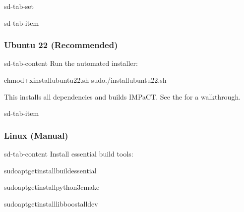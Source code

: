 \documentclass[a4paper,10pt,english]{sphinxmanual}
\begin{document}
\begin{sphinxuseclass}{sd-tab-set}
\begin{sphinxuseclass}{sd-tab-item}\subsubsection*{Ubuntu 22 (Recommended)}

\begin{sphinxuseclass}{sd-tab-content}
\sphinxAtStartPar
Run the automated installer:

\begin{sphinxVerbatim}[commandchars=\\\{\}]
chmod+xinstall\PYGZus{}ubuntu22.sh
sudo./install\PYGZus{}ubuntu22.sh
\end{sphinxVerbatim}

\sphinxAtStartPar
This installs all dependencies and builds IMPaCT. See the
for a walkthrough.

\end{sphinxuseclass}
\end{sphinxuseclass}
\begin{sphinxuseclass}{sd-tab-item}\subsubsection*{Linux (Manual)}

\begin{sphinxuseclass}{sd-tab-content}
\sphinxAtStartPar
Install essential build tools:

\begin{sphinxVerbatim}[commandchars=\\\{\}]
sudoapt\PYGZhy{}getinstallbuild\PYGZhy{}essential
\end{sphinxVerbatim}

\sphinxAtStartPar
{}

\begin{sphinxVerbatim}[commandchars=\\\{\}]
sudoapt\PYGZhy{}getinstallpython3cmake
\end{sphinxVerbatim}

\sphinxAtStartPar
{}

\begin{sphinxVerbatim}[commandchars=\\\{\}]
sudoapt\PYGZhy{}getinstalllibboost\PYGZhy{}all\PYGZhy{}dev
\end{sphinxVerbatim}


\end{sphinxuseclass}
\end{sphinxuseclass}
\end{sphinxuseclass}
\end{document}
